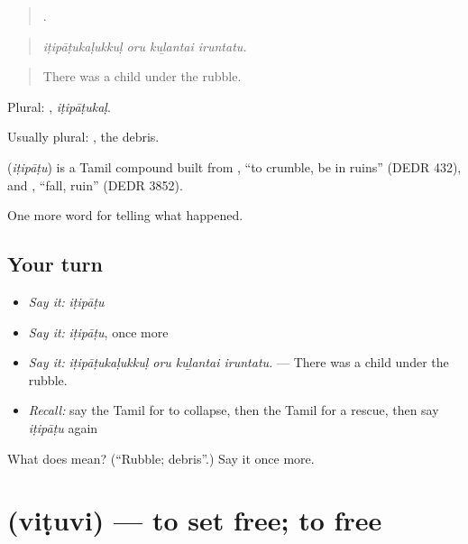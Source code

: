 \begin{quote}
   .
\end{quote}

\begin{quote}
\emph{iṭipāṭukaḷukkuḷ oru kuḻantai iruntatu.}
\end{quote}

\begin{quote}
There was a child under the rubble.
\end{quote}

Plural: , \emph{iṭipāṭukaḷ}.

Usually plural: , the debris.

\begin{cousinweb}
\textbf{} (\emph{iṭipāṭu}) is a Tamil compound built from , \textquotedblleft{}to crumble, be in ruins\textquotedblright{} (DEDR 432), and , \textquotedblleft{}fall, ruin\textquotedblright{} (DEDR 3852).
\end{cousinweb}

\begin{grammarlens}[title={What you've built}]
One more word for telling what happened.
\end{grammarlens}

\subsection*{Your turn}
\begin{itemize}
\raggedright
  \item \emph{Say it:} \emph{iṭipāṭu}
  \item \emph{Say it:} \emph{iṭipāṭu}, once more
  \item \emph{Say it:} \emph{iṭipāṭukaḷukkuḷ oru kuḻantai iruntatu.} — There was a child under the rubble.
  \item \emph{Recall:} say the Tamil for to collapse, then the Tamil for a rescue, then say \emph{iṭipāṭu} again
\end{itemize}

\begin{tcolorbox}[breakable,colback=teal!4,colframe=teal!35!black,title={Before you move on}]
What does  mean? (\textquotedblleft{}Rubble; debris\textquotedblright{}.) Say it once more.
\end{tcolorbox}
\section[\texorpdfstring{\ta{விடுவி} (viṭuvi)}{விடுவி (viṭuvi)}]{ (viṭuvi) — to set free; to free}

